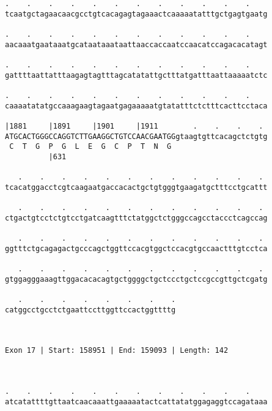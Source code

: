\documentclass{article}
\begin{document}
\begin{Verbatim}
.    .    .    .    .    .    .    .    .    .    .    .    
tcaatgctagaacaacgcctgtcacagagtagaaactcaaaaatatttgctgagtgaatg
                                                            
.    .    .    .    .    .    .    .    .    .    .    .    
aacaaatgaataaatgcataataaataattaaccaccaatccaacatccagacacatagt
                                                            
.    .    .    .    .    .    .    .    .    .    .    .    
gattttaattatttaagagtagtttagcatatattgctttatgatttaattaaaaatctc
                                                            
.    .    .    .    .    .    .    .    .    .    .    .    
caaaatatatgccaaagaagtagaatgagaaaaatgtatatttctctttcacttcctaca
                                                            
|1881     |1891     |1901     |1911        .    .    .    . 
ATGCACTGGGCCAGGTCTTGAAGGCTGTCCAACGAATGGgtaagtgttcacagctctgtg
 C  T  G  P  G  L  E  G  C  P  T  N  G                      
          |631                                              
  
   .    .    .    .    .    .    .    .    .    .    .    . 
tcacatggacctcgtcaagaatgaccacactgctgtgggtgaagatgctttcctgcattt
                                                            
   .    .    .    .    .    .    .    .    .    .    .    . 
ctgactgtcctctgtcctgatcaagtttctatggctctgggccagcctaccctcagccag
                                                            
   .    .    .    .    .    .    .    .    .    .    .    . 
ggtttctgcagagactgcccagctggttccacgtggctccacgtgccaactttgtcctca
                                                            
   .    .    .    .    .    .    .    .    .    .    .    . 
gtggagggaaagttggacacacagtgctggggctgctccctgctccgccgttgctcgatg
                                                            
   .    .    .    .    .    .    .    .
catggcctgcctctgaattccttggttccactggttttg
                                       
                                       
 
Exon 17 | Start: 158951 | End: 159093 | Length: 142



.    .    .    .    .    .    .    .    .    .    .    .    
atcatattttgttaatcaacaaattgaaaaatactcattatatggagaggtccagataaa
                                                            

\end{Verbatim}
\end{document}
